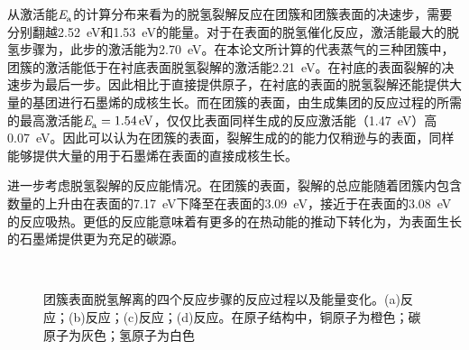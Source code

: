     从激活能$\it E_{\rm a}^{\rm } \it$的计算分布来看为的脱氢裂解反应在团簇和团簇表面的决速步，需要分别翻越\SI{2.52}{\electronvolt}和\SI{1.53}{\electronvolt}的能量。对于在表面的脱氢催化反应，激活能最大的脱氢步骤为，此步的激活能为\SI{2.70}{\electronvolt}。在本论文所计算的代表蒸气的三种团簇中，团簇的激活能低于在衬底表面脱氢裂解的激活能\SI{2.21}{\electronvolt}。在衬底的表面裂解的决速步为最后一步。因此相比于直接提供原子，在衬底的表面的脱氢裂解还能提供大量的基团进行石墨烯的成核生长。而在团簇的表面，由生成集团的反应过程的所需的最高激活能$\it E_{\rm a}^{\rm } \it=\SI{1.54}{\electronvolt}$，仅仅比表面同样生成的反应激活能（\SI{1.47}{\electronvolt}）高\SI{0.07}{\electronvolt}。因此可以认为在团簇的表面，裂解生成的的能力仅稍逊与的表面，同样能够提供大量的用于石墨烯在表面的直接成核生长。 

    进一步考虑脱氢裂解的反应能情况。在团簇的表面，裂解的总应能随着团簇内包含数量的上升由在表面的\SI{7.17}{\electronvolt}下降至在表面的\SI{3.09}{\electronvolt}，接近于在表面的\SI{3.08}{\electronvolt}的反应吸热。更低的反应能意味着有更多的在热动能的推动下转化为，为表面生长的石墨烯提供更为充足的碳源。
    
    \begin{figure}[htb]
        \\[-0.5ex]
        \caption{团簇表面脱氢解离的四个反应步骤的反应过程以及能量变化。(a)反应\mbox{；}(b)反应\mbox{；}(c)反应\mbox{；}(d)反应。在原子结构中，铜原子为橙色；碳原子为灰色；氢原子为白色}
        \label{fig:CG_DFT_Cu3-CH4-C}
    \end{figure}

